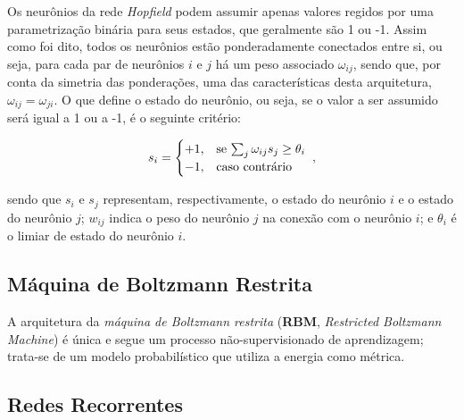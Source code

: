 Os neurônios da rede \textit{Hopfield} podem assumir apenas valores regidos por uma parametrização binária para seus estados, que geralmente são 1 ou -1. Assim como foi dito, todos os neurônios estão ponderadamente conectados entre si, ou seja, para cada par de neurônios $i$ e $j$ há um peso associado $\omega_{ij}$, sendo que, por conta da simetria das ponderações, uma das características desta arquitetura, $\omega_{ij} = \omega_{ji}$. O que define o estado do neurônio, ou seja, se o valor a ser assumido será igual a 1 ou a -1, é o seguinte critério:


    \begin{equation}
        s_{i} = 
        \begin{cases}
            +1, & \text{se $\sum\nolimits_{j}\omega_{ij} s_{j} \geq \theta_{i}$}\\
            -1, & \text{caso contrário}
        \end{cases}
        \hspace{0.1cm},
        \vspace{0.2cm}
        \label{eq:ann_arch_hopfield_state}
    \end{equation}

\noindent sendo que $s_{i}$ e $s_{j}$ representam, respectivamente, o estado do neurônio $i$ e o estado do neurônio $j$; $w_{ij}$ indica o peso do neurônio $j$ na conexão com o neurônio $i$; e $\theta_{i}$ é o limiar de estado do neurônio $i$.


\subsection{Máquina de Boltzmann Restrita}
\label{subsec:ann_boltzmann_machine}

A arquitetura da \textit{máquina de Boltzmann restrita} (\textbf{RBM}, \textit{Restricted Boltzmann Machine}) é única e segue um processo não-supervisionado de aprendizagem; trata-se de um modelo probabilístico que utiliza a energia como métrica.







\subsection{Redes Recorrentes}
\label{subsec:ann_recurrent_nets}









